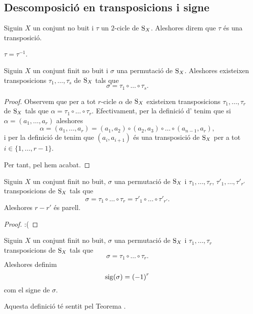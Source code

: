 \documentclass[../../Main.tex]{subfiles}
\begin{document}
	\subsection{Descomposició en transposicions i signe}
	\begin{definition}[Transposició]
		\label{def:transposició}
		Siguin \(X\) un conjunt no buit i \(\tau\) un \(2\)-cicle de \(\operatorname{S}_{X}\). Aleshores direm que \(\tau\) és una transposició.
	\end{definition}
	\begin{observation}
		\(\tau=\tau^{-1}\).
	\end{observation}
	\begin{proposition}
		Siguin \(X\) un conjunt finit no buit i \(\sigma\) una permutació de \(\operatorname{S}_{X}\). Aleshores existeixen transposicions \(\tau_{1},\dots,\tau_{s}\) de \(\operatorname{S}_{X}\) tals que
		\[\sigma=\tau_{1}\circ\dots\circ\tau_{s}.\]
		\begin{proof}
			Observem que per a tot \(r\)-cicle \(\alpha\) de \(\operatorname{S}_{X}\) existeixen transposicions \(\tau_{1},\dots,\tau_{r}\) de \(\operatorname{S}_{X}\) tals que \(\alpha=\tau_{1}\circ\dots\circ\tau_{r}\). Efectivament, per la definició d' tenim que si \(\alpha=(a_{1},\dots,a_{r})\) aleshores
			\[\alpha=(a_{1},\dots,a_{r})=(a_{1},a_{2})\circ(a_{2},a_{3})\circ\dots\circ(a_{n-1},a_{r}),\]
			i per la definició de  tenim que \((a_{i},a_{i+1})\) és una transposició de \(\operatorname{S}_{X}\) per a tot \(i\in\{1,\dots,r-1\}\).
			
			Per tant, pel  hem acabat.
		\end{proof}
	\end{proposition}
	\begin{theorem}
		\label{thm:paritat nombre de transposicions en la descomposició d'una permutació}
		\label{thm:signe d'una permutació}
		Siguin \(X\) un conjunt finit no buit, \(\sigma\) una permutació de \(\operatorname{S}_{X}\) i \(\tau_{1},\dots,\tau_{r}\), \(\tau'_{1},\dots,\tau'_{r'}\) transposicions de \(\operatorname{S}_{X}\) tals que
		\[\sigma=\tau_{1}\circ\dots\circ\tau_{r}=\tau'_{1}\circ\dots\circ\tau'_{r'}.\]
		Aleshores \(r-r'\) és parell.
		\begin{proof}
			:(%
		\end{proof}
	\end{theorem}
	\begin{definition}
		\label{def:signe d'una permutació}
		Siguin \(X\) un conjunt finit no buit, \(\sigma\) una permutació de \(\operatorname{S}_{X}\) i \(\tau_{1},\dots,\tau_{r}\) transposicions de \(\operatorname{S}_{X}\) tals que
		\[\sigma=\tau_{1}\circ\dots\circ\tau_{r}.\]
		Aleshores definim
		\[\operatorname{sig}(\sigma)={(-1)}^{r}\]
		com el signe de \(\sigma\).
		
		Aquesta definició té sentit pel Teorema .
	\end{definition}
\end{document}
